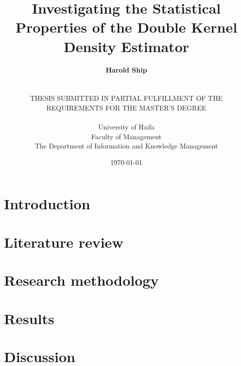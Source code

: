 \documentclass[a4paper,12pt,titlepage,twoside,openany]{book}
\title{
    \textbf{Investigating the Statistical Properties of the Double Kernel Density Estimator}
}
\author{
    \textbf{Harold Ship}\\%
    \\%
    \\%
    THESIS SUBMITTED IN PARTIAL FULFILLMENT OF THE\\%
    REQUIREMENTS FOR THE MASTER'S DEGREE\\%
    \\%
    University of Haifa\\%
    Faculty of Management\\%
    The Department of Information and Knowledge Management
}
\date{\printdayoff\today}
\begin{document}
\lstset{language=R}

\frontmatter                            %
\doublespacing
\maketitle                              %

\cleardoublepage


\cleardoublepage

\singlespacing                          %
\tableofcontents                        %
\cleardoublepage


\cleardoublepage

\listoftables
\cleardoublepage
\listoffigures
\printglossaries


\mainmatter                             %

\onehalfspacing
\chapter{Introduction}
\label{ch:introduction}


% 

\chapter{Literature review}
\label{ch:literature}


\chapter{Research methodology}
\label{ch:method}


\chapter{Results}
\label{ch:results}


\chapter{Discussion}
\label{ch:discussion}

\end{document}
